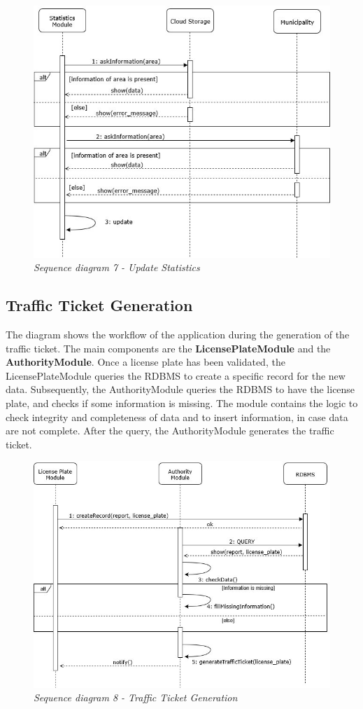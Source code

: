 \begin{figure}[H]
  \centering
  \includegraphics[origin=c,width=\textwidth]{DD_Images/RunTimeView/7.jpg}
  \caption{\textit{Sequence diagram 7 - Update Statistics}}
\end{figure}

\subsection{Traffic Ticket Generation}
The diagram shows the workflow of the application during the generation of the traffic ticket. The main components are the 
\textbf{LicensePlateModule} and the \textbf{AuthorityModule}. Once a license plate has been validated, the LicensePlateModule queries the 
RDBMS to create a specific record for the new data. Subsequently, the AuthorityModule queries the RDBMS to have the license plate, and checks
if some information is missing. The module contains the logic to check integrity and completeness of data and to insert information, in case data 
are not complete. After the query, the AuthorityModule generates the traffic ticket.

\begin{figure}[H]
  \centering
  \includegraphics[origin=c,width=\textwidth]{DD_Images/RunTimeView/8.jpg}
  \caption{\textit{Sequence diagram 8 - Traffic Ticket Generation}}
\end{figure}

